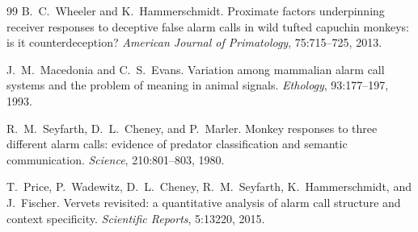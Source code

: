 \begin{thebibliography}{99}
B.~C.~Wheeler and K.~Hammerschmidt. \newblock Proximate factors underpinning receiver responses to deceptive false alarm calls in wild tufted capuchin monkeys: is it counterdeception? \newblock \emph{American Journal of Primatology}, 75:715--725, 2013.


J.~M.~Macedonia and C.~S.~Evans. \newblock Variation among mammalian alarm call systems and the problem of meaning in animal signals. \newblock \emph{Ethology}, 93:177--197, 1993.

R.~M.~Seyfarth, D.~L.~Cheney, and P.~Marler. \newblock Monkey responses to three different alarm calls: evidence of predator classification and semantic communication. \newblock \emph{Science}, 210:801--803, 1980.

T.~Price, P.~Wadewitz, D.~L.~Cheney, R.~M.~Seyfarth, K.~Hammerschmidt, and J.~Fischer. \newblock Vervets revisited: a quantitative analysis of alarm call structure and context specificity. \newblock \emph{Scientific Reports}, 5:13220, 2015.

\end{thebibliography}


